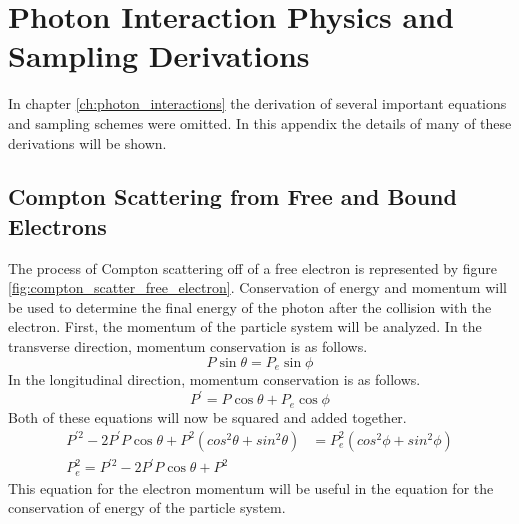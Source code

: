 \chapter{Photon Interaction Physics and Sampling Derivations}
\label{ch:appendix_B}
In chapter \ref{ch:photon_interactions} the derivation of several important
equations and sampling schemes were omitted. In this appendix the details of 
many of these derivations will be shown. 

\section{Compton Scattering from Free and Bound Electrons}
The process of Compton scattering off of a free electron is represented by 
figure \ref{fig:compton_scatter_free_electron}. Conservation of energy and 
momentum will be used to determine the final energy of the photon after the 
collision with the electron. First, the momentum of the particle system will be 
analyzed. In the transverse direction, momentum conservation is as follows.
\begin{equation*}
  P\sin{\theta} = P_e\sin{\phi}
\end{equation*}
In the longitudinal direction, momentum conservation is as follows.
\begin{equation*}
  P^{'} = P\cos{\theta} + P_e\cos{\phi} 
\end{equation*}
Both of these equations will now be squared and added together.
\begin{align}
  P^{'2} - 2P^{'}P\cos{\theta} + P^2(cos^2\theta + sin^2\theta) & = 
  P_e^2(cos^2\phi + sin^2\phi) \nonumber \\
  P_e^2 = P^{'2} - 2P^{'}P\cos{\theta} + P^2
\end{align}
This equation for the electron momentum will be useful in the equation for
the conservation of energy of the particle system.


